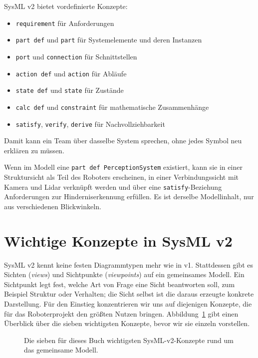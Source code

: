 SysML v2 bietet vordefinierte Konzepte:

\begin{itemize}
    \item \texttt{requirement} für Anforderungen
    \item \texttt{part def} und \texttt{part} für Systemelemente und deren Instanzen
    \item \texttt{port} und \texttt{connection} für Schnittstellen
    \item \texttt{action def} und \texttt{action} für Abläufe
    \item \texttt{state def} und \texttt{state} für Zustände
    \item \texttt{calc def} und \texttt{constraint} für mathematische Zusammenhänge
    \item \texttt{satisfy}, \texttt{verify}, \texttt{derive} für Nachvollziehbarkeit
\end{itemize}

Damit kann ein Team über dasselbe System sprechen, ohne jedes Symbol neu erklären zu müssen.

\begin{praxisbox}
Wenn im Modell eine \texttt{part def PerceptionSystem} existiert, kann sie in einer Struktursicht als Teil des Roboters erscheinen, in einer Verbindungssicht mit Kamera und Lidar verknüpft werden und über eine \texttt{satisfy}-Beziehung Anforderungen zur Hinderniserkennung erfüllen. Es ist derselbe Modellinhalt, nur aus verschiedenen Blickwinkeln.
\end{praxisbox}

\section{Wichtige Konzepte in SysML v2}
SysML v2 kennt keine festen Diagrammtypen mehr wie in v1. Stattdessen gibt es Sichten (\emph{views}) und Sichtpunkte (\emph{viewpoints}) auf ein gemeinsames Modell. Ein Sichtpunkt legt fest, welche Art von Frage eine Sicht beantworten soll, zum Beispiel Struktur oder Verhalten; die Sicht selbst ist die daraus erzeugte konkrete Darstellung. Für den Einstieg konzentrieren wir uns auf diejenigen Konzepte, die für das Roboterprojekt den größten Nutzen bringen. Abbildung~\ref{fig:kap03-sysml-kernkonzepte} gibt einen Überblick über die sieben wichtigsten Konzepte, bevor wir sie einzeln vorstellen.

\begin{figure}[H]
  \centering
  \caption{Die sieben für dieses Buch wichtigsten SysML-v2-Konzepte rund um das gemeinsame Modell.}
  \label{fig:kap03-sysml-kernkonzepte}
\end{figure}

